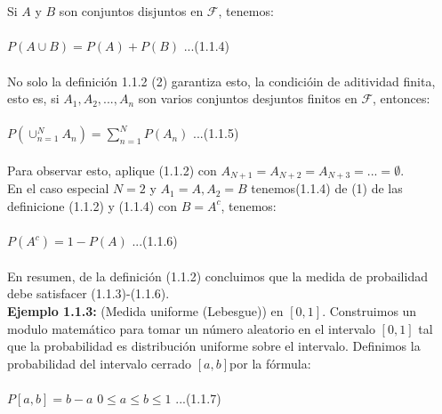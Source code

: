\documentclass{article}
\begin{document}
        \\
        \\
        Si $A$ y $B$ son conjuntos disjuntos en $\mathcal{F}$, tenemos:
        \\
        \\
        $P(A \cup B) = P(A) + P(B)$ ...(1.1.4)
        \\
        \\
        No solo la definición 1.1.2 (2) garantiza esto, la condicióin de aditividad finita, esto es, si $A_1, A_2, ..., A_n$ son varios conjuntos desjuntos finitos en $\mathcal{F}$, entonces:
        \\
        \\
        $P(\cup _{n=1} ^ N A_n) = \sum_{n=1}^{N} P(A_n)$ ...(1.1.5)
        \\
        \\
        Para observar esto, aplique (1.1.2) con $A_{N+1} = A_{N+2} = A_{N+3} = ... = \emptyset$.
        \\
        En el caso especial $N=2$ y $A_1 = A, A_2 = B$ tenemos(1.1.4) de (1) de las definicione (1.1.2) y (1.1.4) con $B = A^c$, tenemos:
        \\
        \\
        $P(A^c) = 1 - P(A)$ ...(1.1.6)
        \\
        \\
        En resumen, de la definición (1.1.2) concluimos que la medida de probailidad debe satisfacer (1.1.3)-(1.1.6).
        \\
        \textbf{Ejemplo 1.1.3:} (Medida uniforme (Lebesgue)) en $[0,1]$. Construimos un modulo matemático para tomar
        un número aleatorio en el intervalo $[0,1]$ tal que la probabilidad es distribución uniforme sobre el intervalo. Definimos la probabilidad del intervalo
        cerrado $[a, b]$por la fórmula:
        \\
        \\
        $P[a,b] = b-a$    $0 \le a \le b \le 1$ ...(1.1.7)
\end{document}
